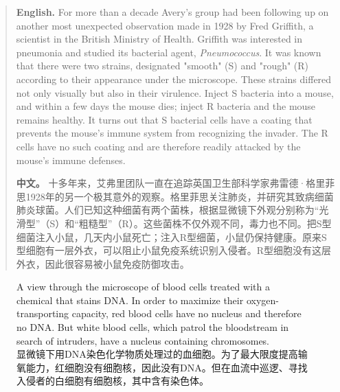 \begin{quote}
\noindent\textbf{English.} For more than a decade Avery's group had been following up on another most unexpected observation made in 1928 by Fred Griffith, a scientist in the British Ministry of Health. Griffith was interested in pneumonia and studied its bacterial agent, \emph{Pneumococcus}. It was known that there were two strains, designated "smooth" (S) and "rough" (R) according to their appearance under the microscope. These strains differed not only visually but also in their virulence. Inject S bacteria into a mouse, and within a few days the mouse dies; inject R bacteria and the mouse remains healthy. It turns out that S bacterial cells have a coating that prevents the mouse's immune system from recognizing the invader. The R cells have no such coating and are therefore readily attacked by the mouse's immune defenses.

\smallskip
\noindent\textbf{中文。} 十多年来，艾弗里团队一直在追踪英国卫生部科学家弗雷德·格里菲思1928年的另一个极其意外的观察。格里菲思关注肺炎，并研究其致病细菌肺炎球菌。人们已知这种细菌有两个菌株，根据显微镜下外观分别称为“光滑型”（S）和“粗糙型”（R）。这些菌株不仅外观不同，毒力也不同。把S型细菌注入小鼠，几天内小鼠死亡；注入R型细菌，小鼠仍保持健康。原来S型细胞有一层外衣，可以阻止小鼠免疫系统识别入侵者。R型细胞没有这层外衣，因此很容易被小鼠免疫防御攻击。
\end{quote}

\begin{figure}[htbp]
\centering
{}
\caption{A view through the microscope of blood cells treated with a chemical that stains DNA. In order to maximize their oxygen-transporting capacity, red blood cells have no nucleus and therefore no DNA. But white blood cells, which patrol the bloodstream in search of intruders, have a nucleus containing chromosomes.\\显微镜下用DNA染色化学物质处理过的血细胞。为了最大限度提高输氧能力，红细胞没有细胞核，因此没有DNA。但在血流中巡逻、寻找入侵者的白细胞有细胞核，其中含有染色体。}
\end{figure}

